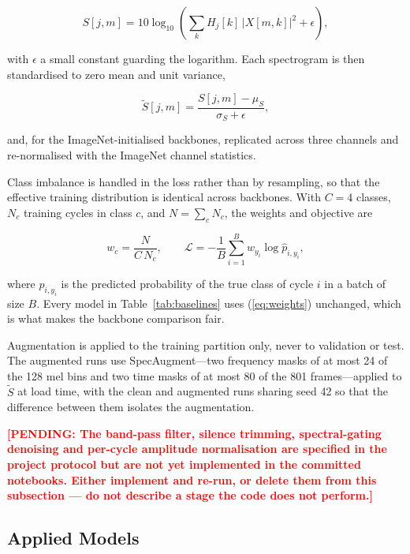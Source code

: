 \documentclass[journal,onecolumn]{IEEEtran}
\newcommand{\pending}[1]{\textcolor{red}{\textbf{[PENDING: #1]}}}
\begin{document}
\begin{equation}
\label{eq:logmel}
S[j,m] = 10 \log_{10}\!\left( \sum_{k} H_j[k]\,\bigl| X[m,k] \bigr|^{2} + \epsilon \right),
\end{equation}

\noindent with $\epsilon$ a small constant guarding the logarithm. Each spectrogram is
then standardised to zero mean and unit variance,

\begin{equation}
\label{eq:standardize}
\tilde{S}[j,m] = \frac{S[j,m] - \mu_S}{\sigma_S + \epsilon},
\end{equation}

\noindent and, for the ImageNet-initialised backbones, replicated across three
channels and re-normalised with the ImageNet channel statistics.

Class imbalance is handled in the loss rather than by resampling, so that the
effective training distribution is identical across backbones. With $C = 4$ classes,
$N_c$ training cycles in class $c$, and $N = \sum_c N_c$, the weights and objective
are

\begin{equation}
\label{eq:weights}
w_c = \frac{N}{C \, N_c},
\qquad
\mathcal{L} = -\frac{1}{B}\sum_{i=1}^{B} w_{y_i} \log \hat{p}_{i,y_i},
\end{equation}

\noindent where $\hat{p}_{i,y_i}$ is the predicted probability of the true class of
cycle $i$ in a batch of size $B$. Every model in Table~\ref{tab:baselines} uses
(\ref{eq:weights}) unchanged, which is what makes the backbone comparison fair.

Augmentation is applied to the training partition only, never to validation or test.
The augmented runs use SpecAugment---two frequency masks of at most 24 of the 128 mel
bins and two time masks of at most 80 of the 801 frames---applied to
$\tilde{S}$ at load time, with the clean and augmented runs sharing seed 42 so that
the difference between them isolates the augmentation.

\pending{The band-pass filter, silence trimming, spectral-gating denoising and
per-cycle amplitude normalisation are specified in the project protocol but are not
yet implemented in the committed notebooks. Either implement and re-run, or delete
them from this subsection --- do not describe a stage the code does not perform.}

\subsection{Applied Models}
\label{subsec:models}
\end{document}
